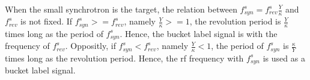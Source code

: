 When the small synchrotron is the target, the relation between $f_{\mathit{syn}}^{s}=f_{\mathit{rev}}^{s}\frac{Y}{\kappa}$ and $f_{\mathit{rev}}^{s}$ is not fixed. If $f_{\mathit{syn}}^{s}>=f_{\mathit{rev}}^{s}$, namely $\frac{Y}{\kappa}>=1$, the revolution period is $\frac{Y}{\kappa}$ times long as the period of $f_{\mathit{syn}}^{s}$. Hence, the bucket label signal is with the frequency of $f_{\mathit{rev}}^{s}$. 
Oppositly,  if $f_{\mathit{syn}}^{s}<f_{\mathit{rev}}^{s}$, namely $\frac{Y}{\kappa}<1$, the period of $f_{\mathit{syn}}^{s}$ is $\frac{\kappa}{Y}$ times long as the revolution period. Hence, the rf frequency with $f_{\mathit{syn}}^{s}$ is used as a bucket label signal. 






 

